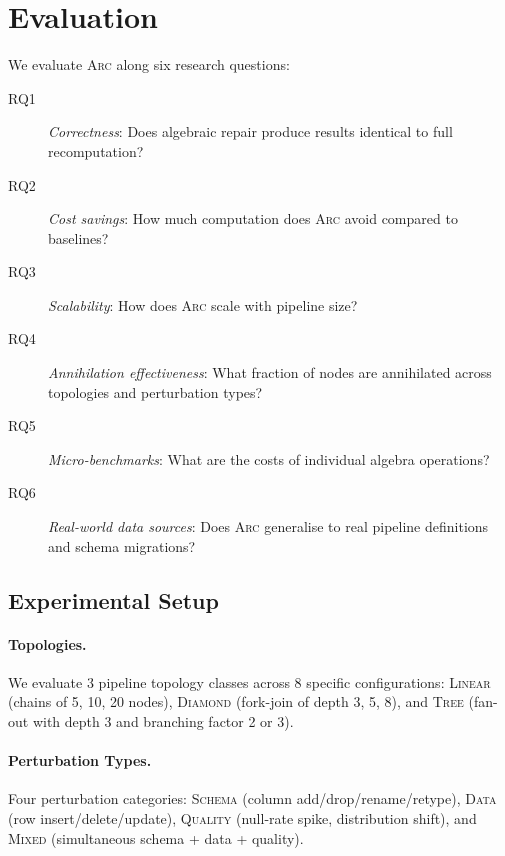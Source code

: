 \documentclass[sigplan,screen,nonacm]{acmart}
\newcommand{\arc}{\textsc{Arc}\xspace}
\begin{document}
\section{Evaluation}\label{sec:eval}

We evaluate \arc along six research questions:

\begin{description}
\item[RQ1] \emph{Correctness}: Does algebraic repair produce results
  identical to full recomputation?
\item[RQ2] \emph{Cost savings}: How much computation does \arc avoid
  compared to baselines?
\item[RQ3] \emph{Scalability}: How does \arc scale with pipeline size?
\item[RQ4] \emph{Annihilation effectiveness}: What fraction of nodes are
  annihilated across topologies and perturbation types?
\item[RQ5] \emph{Micro-benchmarks}: What are the costs of individual
  algebra operations?
\item[RQ6] \emph{Real-world data sources}: Does \arc generalise to
  real pipeline definitions and schema migrations?
\end{description}

\subsection{Experimental Setup}

\paragraph{Topologies.}
We evaluate 3 pipeline topology classes across 8 specific configurations:
\textsc{Linear} (chains of 5, 10, 20 nodes),
\textsc{Diamond} (fork-join of depth 3, 5, 8),
and \textsc{Tree} (fan-out with depth 3 and branching factor 2 or 3).

\paragraph{Perturbation Types.}
Four perturbation categories: \textsc{Schema} (column add/drop/rename/retype),
\textsc{Data} (row insert/delete/update), \textsc{Quality} (null-rate spike,
distribution shift), and \textsc{Mixed} (simultaneous schema + data +
quality).
\end{document}
